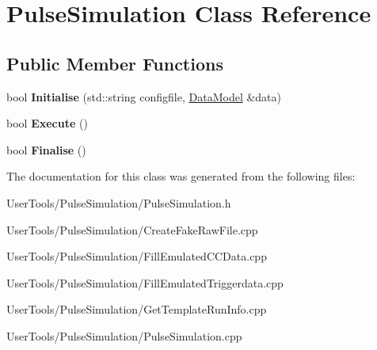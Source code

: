 \hypertarget{classPulseSimulation}{
\section{PulseSimulation Class Reference}
\label{classPulseSimulation}
}
\subsection*{Public Member Functions}
\begin{DoxyCompactItemize}
\item 
\hypertarget{classPulseSimulation_a58b5d01a88aa646f8f89ec60372fdfec}{
bool {\bfseries Initialise} (std::string configfile, \hyperlink{classDataModel}{DataModel} \&data)}
\label{classPulseSimulation_a58b5d01a88aa646f8f89ec60372fdfec}

\item 
\hypertarget{classPulseSimulation_ae65d207c87254a420c4b25172354bef7}{
bool {\bfseries Execute} ()}
\label{classPulseSimulation_ae65d207c87254a420c4b25172354bef7}

\item 
\hypertarget{classPulseSimulation_a8a798184a88f99597de1266fe34fed10}{
bool {\bfseries Finalise} ()}
\label{classPulseSimulation_a8a798184a88f99597de1266fe34fed10}

\end{DoxyCompactItemize}


The documentation for this class was generated from the following files:\begin{DoxyCompactItemize}
\item 
UserTools/PulseSimulation/PulseSimulation.h\item 
UserTools/PulseSimulation/CreateFakeRawFile.cpp\item 
UserTools/PulseSimulation/FillEmulatedCCData.cpp\item 
UserTools/PulseSimulation/FillEmulatedTriggerdata.cpp\item 
UserTools/PulseSimulation/GetTemplateRunInfo.cpp\item 
UserTools/PulseSimulation/PulseSimulation.cpp\end{DoxyCompactItemize}
